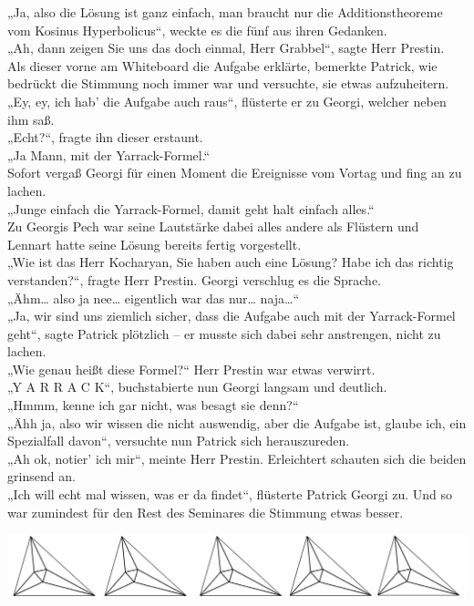 \documentclass[oneside]{memoir}
\newcommand{\parasep}{
\bigskip
\bigskip
\begin{center} 
   \includegraphics[scale=.08]{parasep5.jpg} 
\end{center}
\bigskip
\bigskip
}
\begin{document}
„Ja, also die Lösung ist ganz einfach, man braucht nur die Additionstheoreme vom Kosinus Hyperbolicus“, weckte es die fünf aus ihren Gedanken. \\
„Ah, dann zeigen Sie uns das doch einmal, Herr Grabbel“, sagte Herr Prestin. \\
Als dieser vorne am Whiteboard die Aufgabe erklärte, bemerkte Patrick, wie bedrückt die Stimmung noch immer war und versuchte, sie etwas aufzuheitern. \\
„Ey, ey, ich hab' die Aufgabe auch raus“, flüsterte er zu Georgi, welcher neben ihm saß. \\
„Echt?“, fragte ihn dieser erstaunt. \\
„Ja Mann, mit der Yarrack-Formel.“ \\
Sofort vergaß Georgi für einen Moment die Ereignisse vom Vortag und fing an zu lachen.  \\
„Junge einfach die Yarrack-Formel, damit geht halt einfach alles.“ \\
Zu Georgis Pech war seine Lautstärke dabei alles andere als Flüstern und Lennart hatte seine Lösung bereits fertig vorgestellt.  \\
„Wie ist das Herr Kocharyan, Sie haben auch eine Lösung? Habe ich das richtig verstanden?“, fragte Herr Prestin. Georgi verschlug es die Sprache. \\
„Ähm\ldots{} also ja nee\ldots{} eigentlich war das nur\ldots{} naja\ldots“ \\
„Ja, wir sind uns ziemlich sicher, dass die Aufgabe auch mit der Yarrack-Formel geht“, sagte Patrick plötzlich -- er musste sich dabei sehr anstrengen, nicht zu lachen. \\
„Wie genau heißt diese Formel?“ Herr Prestin war etwas verwirrt. \\
„Y A R R A C K“, buchstabierte nun Georgi langsam und deutlich.  \\
„Hmmm, kenne ich gar nicht, was besagt sie denn?“ \\
„Ähh ja, also wir wissen die nicht auswendig, aber die Aufgabe ist, glaube ich, ein Spezialfall davon“, versuchte nun Patrick sich herauszureden.  \\
„Ah ok, notier' ich mir“, meinte Herr Prestin. Erleichtert schauten sich die beiden grinsend an.  \\
„Ich will echt mal wissen, was er da findet“, flüsterte Patrick Georgi zu. Und so war zumindest für den Rest des Seminares die Stimmung etwas besser. 

\parasep
\end{document}
